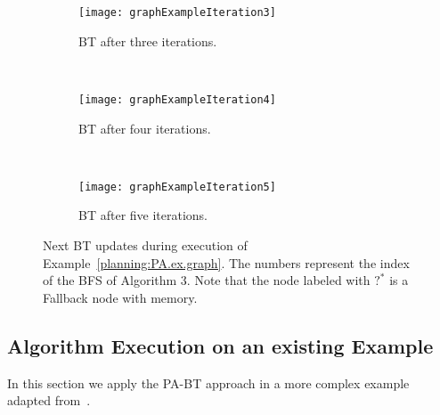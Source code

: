 \begin{figure}[h!]

  \centering    
        \begin{subfigure}[b]{1\columnwidth}
                \centering
                \texttt{[image: graphExampleIteration3]}
                \caption{BT after three iterations.}
                \label{planning:PA.fig.graphit3}
        \end{subfigure}  
        
~
      \begin{subfigure}[b]{1\columnwidth}
                \centering
                \texttt{[image: graphExampleIteration4]}
                \caption{BT after four iterations.}
                \label{planning:PA.fig.graphit4}
        \end{subfigure}  
        
 ~       
              \begin{subfigure}[b]{1\columnwidth}
                \centering
                \texttt{[image: graphExampleIteration5]}
                \caption{BT after five iterations.}
                \label{planning:PA.fig.graphit5}
        \end{subfigure}        
        \caption{Next BT updates during execution of Example~\ref{planning:PA.ex.graph}. The numbers represent the index of the BFS of Algorithm 3. {Note that the node labeled with $?^*$ is a Fallback node with memory.}}
\end{figure}

\subsection{Algorithm Execution on an existing Example}
In this section we apply the PA-BT approach in a more complex example adapted from~\cite{kaelbling2011hierarchical}.

